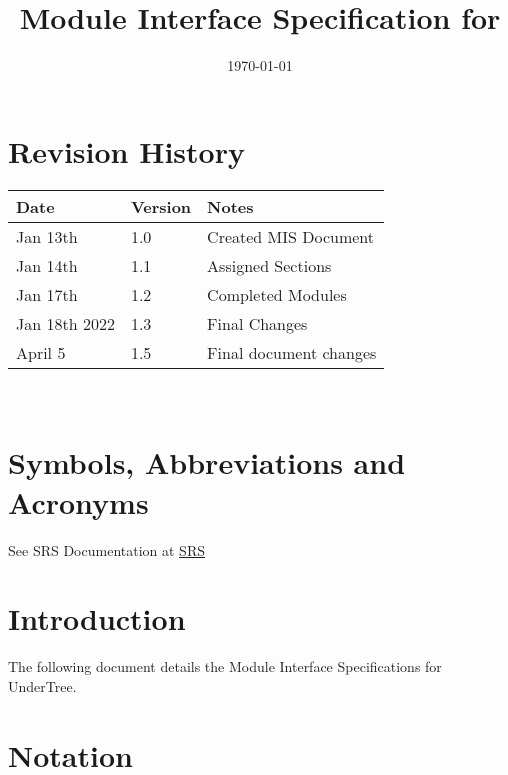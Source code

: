 \documentclass[12pt, titlepage]{article}
\begin{document}
	
	\title{Module Interface Specification for \progname{}}
	
	\author{\authname}
	
	\date{\today}
	
	\maketitle
	
	
	\section{Revision History}
	
	\begin{tabularx}{\textwidth}{p{3cm}p{2cm}X}
		\toprule {\bf Date} & {\bf Version} & {\bf Notes}\\
		\midrule
		Jan 13th & 1.0 & Created MIS Document\\
		Jan 14th & 1.1 & Assigned Sections\\
		Jan 17th & 1.2 & Completed Modules\\
		Jan 18th 2022 & 1.3 & Final Changes\\
		April 5 & 1.5 & Final document changes \\
		\bottomrule
	\end{tabularx}
	
	~\newpage
	
	\section{Symbols, Abbreviations and Acronyms}
	
	See SRS Documentation at \href{https://github.com/RutheniumVI/UnderTree/blob/main/docs/SRS/SRS.pdf}{SRS}
	
	\newpage
	
	\tableofcontents
	
	\newpage
	
	
	\section{Introduction}
	
	The following document details the Module Interface Specifications for
	UnderTree.
	
	
	\section{Notation}
	
\end{document}
